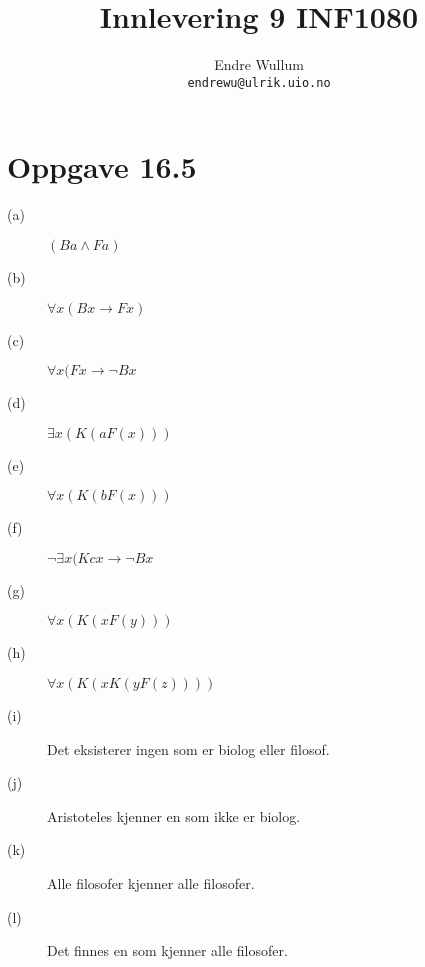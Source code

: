 \documentclass[12pt,norsk,a4paper]{article}
\title{Innlevering 9 INF1080}
\author{Endre Wullum\\ \texttt{endrewu@ulrik.uio.no}}
\begin{document}
\maketitle

\section*{Oppgave 16.5}
\begin{description}
\item[(a)]$(Ba \land Fa)$
\item[(b)]$\forall x(Bx \rightarrow Fx)$
\item[(c)]$\forall x(Fx \rightarrow \neg Bx$
\item[(d)]$\exists x(K(aF(x)))$
\item[(e)]$\forall x(K(bF(x)))$
\item[(f)]$\neg \exists x(Kcx \rightarrow \neg Bx$
\item[(g)]$\forall x(K(xF(y)))$
\item[(h)]$\forall x(K(xK(yF(z))))$
\item[(i)]Det eksisterer ingen som er biolog eller filosof.
\item[(j)]Aristoteles kjenner en som ikke er biolog.
\item[(k)]Alle filosofer kjenner alle filosofer.
\item[(l)]Det finnes en som kjenner alle filosofer.
\end{description}


\end{document}
